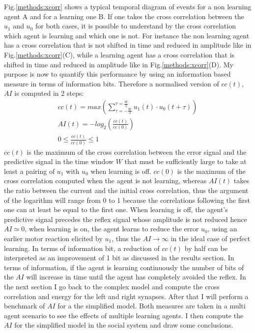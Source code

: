 Fig.\ref{methods:xcorr} shows a typical temporal diagram of events for a non
learning agent A and for a learning one B.
If one takes the cross correlation between the $u_1$ and $u_0$ for both cases,
it is possible to understand by the cross correlation which agent is learning and
 which one is not. For instance the non learning agent has a cross correlation
that is not shifted in time and reduced in amplitude like in Fig.\ref{methods:xcorr}(C),
while a learning agent has a cross correlation that is shifted in time and reduced
in amplitude like in Fig.\ref{methods:xcorr}(D).
My purpose is now to quantify this performance by using an information based measure
in terms of information bits.
Therefore a normalised version of $cc(t)$,$AI$ is computed in 2 steps:
\begin{align}
cc(t)=max (\sum_{\tau=-\frac{W}{2}}^{\tau=\frac{W}{2}} u_{1}(t)\cdot u_0(t+\tau)) \label{eq:maxcorr:cc}\\
AI(t)=-log_{2}(\frac{cc(t)}{cc(0)})\\
0 \leq \frac{cc(t)}{cc(0)} \leq 1
\end{align}
$cc(t)$ is the maximum of the cross correlation between the error signal and
the predictive signal in the time window $W$ that must be sufficiently large
to take at least a pairing of $u_1$ with $u_0$ when learning is off. $cc(0)$
is the maximum of the cross correlation computed when the agent is not learning,
whereas $AI(t)$ takes the ratio between the current and the initial cross correlation,
thus the argument of the logarithm will range from 0 to 1 because the correlations
following the first one can at least be equal to the first one.
When learning is off, the agent's predictive signal precedes the reflex signal whose
amplitude is not reduced hence $AI\simeq 0$, when learning is on, the agent learns
to reduce the error $u_{0}$, using an earlier motor reaction elicited by $u_{1}$,
thus the $AI \rightarrow \infty$ in the ideal case of perfect learning.
In terms of information bit, a reduction of $cc(t)$ by half can be interpreted
as an improvement of 1 bit as discussed in the results section.
In terms of information, if the agent is learning continuously the number of bits of
the $AI$ will increase in time until the agent has completely avoided the reflex.
In the next section I go back to the complex model and compute the cross correlation
and energy for the left and right synapses.
After that I will perform a benchmark of $AI$ for a the simplified model.
Both measures are taken in a multi agent scenario to see the effects of 
multiple learning agents.
I then compute the $AI$ for the simplified model in the social system and
draw some conclusions.

